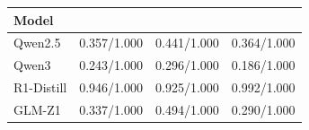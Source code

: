 \begin{tabular}{@{}lccc@{}}
\toprule
Model & \AlgOne{} & \DiffPCA{} & \Pooled{} \\
\midrule
Qwen2.5 & 0.357/1.000 & 0.441/1.000 & 0.364/1.000 \\
Qwen3 & 0.243/1.000 & 0.296/1.000 & 0.186/1.000 \\
R1-Distill & 0.946/1.000 & 0.925/1.000 & 0.992/1.000 \\
GLM-Z1 & 0.337/1.000 & 0.494/1.000 & 0.290/1.000 \\
\bottomrule
\end{tabular}
